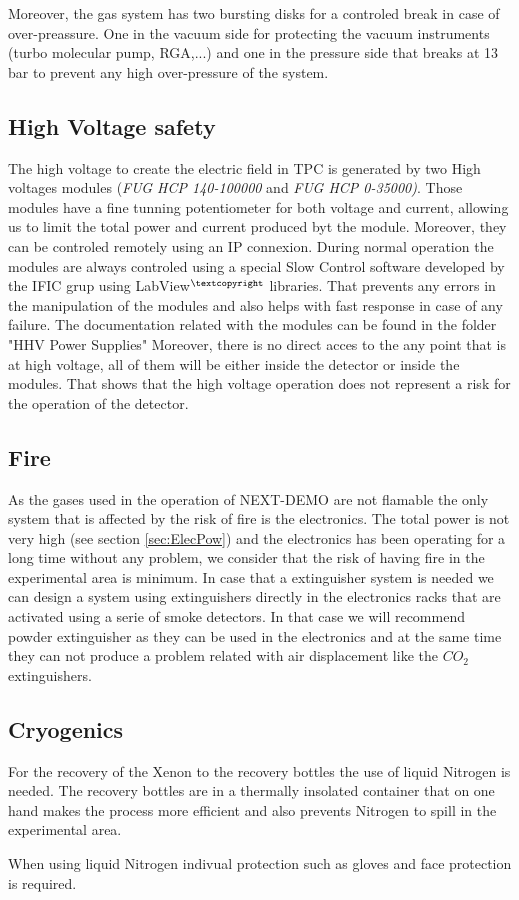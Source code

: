 Moreover, the gas system has two bursting disks for a controled break in case of over-preassure. One in the vacuum side for protecting the vacuum instruments (turbo molecular pump, RGA,...) and one in the pressure side that breaks at 13 bar to prevent any high over-pressure of the system.



\subsection{High Voltage safety}

The high voltage to create the electric field in TPC is generated by two High voltages modules (\textit{FUG HCP 140-100000} and \textit{FUG HCP 0-35000)}. Those modules have a fine tunning potentiometer for both voltage and current, allowing us to limit the total power and current produced byt the module. Moreover, they can be controled remotely using an IP connexion. During normal operation the modules are always controled using a special Slow Control software developed by the IFIC grup using LabView$^{\textcopyright}$ libraries. That prevents any errors in the manipulation of the modules and also helps with fast response in case of any failure.
The documentation related with the modules can be found in the folder "HHV Power Supplies"
Moreover, there is no direct acces to the any point that is at high voltage, all of them will be either inside the detector or inside the modules. That shows that the high voltage operation does not represent a risk for the operation of the detector.


\subsection{Fire}

As the gases used in the operation of NEXT-DEMO are not flamable the only system that is affected by the risk of fire is the electronics. The total power is not very high (see section \ref{sec:ElecPow}) and the electronics has been operating for a long time without any problem, we consider that the risk of having fire in the experimental area is minimum. In case that a extinguisher system is needed we can design a system using extinguishers directly in the electronics racks that are activated using a serie of smoke detectors. In that case we will recommend powder extinguisher as they can be used in the electronics and at the same time they can not produce a problem related with air displacement like the $CO_2$ extinguishers.


\subsection{Cryogenics}

For the recovery of the Xenon to the recovery bottles the use of liquid Nitrogen is needed. The recovery bottles are in a thermally insolated container that on one hand makes the process more efficient and also prevents Nitrogen to spill in the experimental area.

When using liquid Nitrogen indivual protection such as gloves and face protection is required. 



